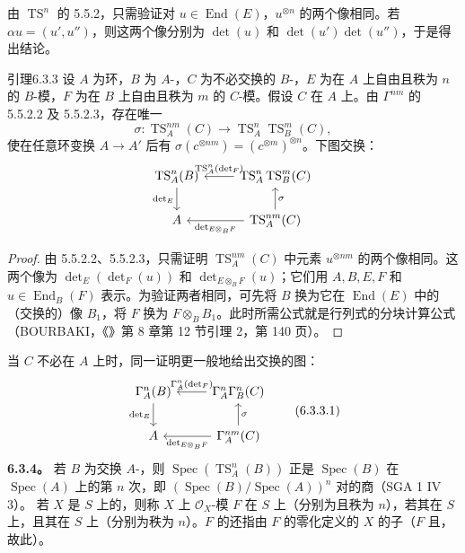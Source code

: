 由 $\operatorname{TS}^n$ 的 5.5.2，只需验证对 $u\in\operatorname{End}(E)$，$u^{\otimes n}$ 的两个像相同。若 $\alpha u=(u',u'')$，则这两个像分别为 $\det(u)$ 和 $\det(u')\det(u'')$，于是得出结论。
\begin{SGAresult}{引理}{6.3.3}
设 $A$ 为环，$B$ 为 $A$-，$C$ 为不必交换的 $B$-，$E$ 为在 $A$ 上自由且秩为 $n$ 的 $B$-模，$F$ 为在 $B$ 上自由且秩为 $m$ 的 $C$-模。假设 $C$ 在 $A$ 上。由 $\Gamma^{nm}$ 的 5.5.2.2 及 5.5.2.3，存在唯一
\[\sigma:\operatorname{TS}_A^{nm}(C)\longrightarrow\operatorname{TS}_A^n\operatorname{TS}_B^m(C),\]
使在任意环变换 $A\to A'$ 后有 $\sigma(c^{\otimes nm})=(c^{\otimes m})^{\otimes n}$。下图交换：
\[\begin{tikzcd}\operatorname{TS}_A^n(B)\arrow[d,"\det_E"']&\operatorname{TS}_A^n\operatorname{TS}_B^m(C)\arrow[l,"\operatorname{TS}_A^n(\det_F)"']\\A&\operatorname{TS}_A^{nm}(C)\arrow[u,"\sigma"']\arrow[l,"\det_{E\otimes_BF}"]\end{tikzcd}\]
\end{SGAresult}
\begin{proof}
由 5.5.2.2、5.5.2.3，只需证明 $\operatorname{TS}_A^{nm}(C)$ 中元素 $u^{\otimes nm}$ 的两个像相同。这两个像为 $\det_E(\det_F(u))$ 和 $\det_{E\otimes_BF}(u)$；它们用 $A,B,E,F$ 和 $u\in\operatorname{End}_B(F)$ 表示。为验证两者相同，可先将 $B$ 换为它在 $\operatorname{End}(E)$ 中的（交换的）像 $B_1$，将 $F$ 换为 $F\otimes_BB_1$。此时所需公式就是行列式的分块计算公式（BOURBAKI，《》第 8 章第 12 节引理 2，第 140 页）。
\end{proof}
当 $C$ 不必在 $A$ 上时，同一证明更一般地给出交换的图：
\[\begin{tikzcd}\Gamma_A^n(B)\arrow[d,"\det_E"']&\Gamma_A^n\Gamma_B^n(C)\arrow[l,"\Gamma_A^n(\det_F)"']\\A&\Gamma_A^{nm}(C)\arrow[u,"\sigma"']\arrow[l,"\det_{E\otimes_BF}"]\end{tikzcd}\tag{6.3.3.1}\]
\textbf{6.3.4。} 若 $B$ 为交换 $A$-，则 $\operatorname{Spec}(\operatorname{TS}_A^n(B))$ 正是 $\operatorname{Spec}(B)$ 在 $\operatorname{Spec}(A)$ 上的第 $n$ 次，即 $(\operatorname{Spec}(B)/\operatorname{Spec}(A))^n$ 对的商（SGA 1 IV 3）。
若 $X$ 是 $S$ 上的，则称 $X$ 上 $\mathcal O_X$-模 $F$ 在 $S$ 上（分别为且秩为 $n$），若其在 $S$ 上，且其在 $S$ 上（分别为秩为 $n$）。$F$ 的还指由 $F$ 的零化定义的 $X$ 的子（$F$ 且，故此）。

